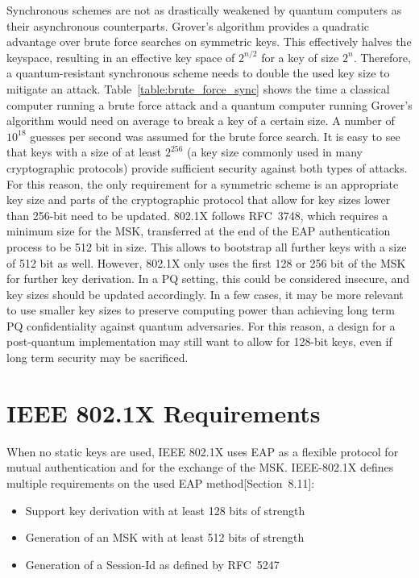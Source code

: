 Synchronous schemes are not as drastically weakened by quantum computers as their asynchronous counterparts. Grover's algorithm provides a quadratic advantage over brute force searches on symmetric keys. This effectively halves the keyspace, resulting in an effective key space of \(2^{n/2}\) for a key of size \(2^n\). Therefore, a quantum-resistant synchronous scheme needs to double the used key size to mitigate an attack. Table~\ref{table:brute_force_sync} shows the time a classical computer running a brute force attack and a quantum computer running Grover's algorithm would need on average to break a key of a certain size. A number of \(10^{18}\) guesses per second was assumed for the brute force search. It is easy to see that keys with a size of at least \(2^{256}\) (a key size commonly used in many cryptographic protocols) provide sufficient security against both types of attacks. For this reason, the only requirement for a symmetric scheme is an appropriate key size and parts of the cryptographic protocol that allow for key sizes lower than 256-bit need to be updated. 802.1X follows RFC~3748, which requires a minimum size for the \ac{MSK}, transferred at the end of the EAP authentication process to be 512 bit in size\cite{rfc3748}. This allows to bootstrap all further keys with a size of 512 bit as well. However, 802.1X only uses the first 128 or 256 bit of the \ac{MSK} for further key derivation. In a \ac{PQ} setting, this could be considered insecure, and key sizes should be updated accordingly. In a few cases, it may be more relevant to use smaller key sizes to preserve computing power than achieving long term \ac{PQ} confidentiality against quantum adversaries. For this reason, a design for a post-quantum implementation may still want to allow for 128-bit keys, even if long term security may be sacrificed.

\section{IEEE 802.1X Requirements}
When no static keys are used, IEEE 802.1X uses \ac{EAP} as a flexible protocol for mutual authentication and for the exchange of the \ac{MSK}. IEEE-802.1X defines multiple requirements on the used \ac{EAP} method[Section~8.11]\cite{IEEE8021X}:

\begin{itemize}
\setlength{\itemsep}{0pt}
    \item Support key derivation with at least 128 bits of strength
    \item Generation of an \ac{MSK} with at least 512 bits of strength
    \item Generation of a Session-Id as defined by RFC~5247
\end{itemize}

